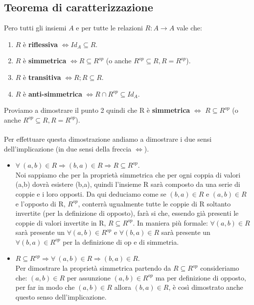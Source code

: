 \subsection{Teorema di caratterizzazione}
\begin{theorem}\label{Teorema-caratterizzazione}
    Pero tutti gli insiemi $A$ e per tutte le relazioni $R: A \rightarrow A$ vale che:
    \begin{enumerate}
        \item $R$ è \textbf{riflessiva} $\Longleftrightarrow Id_A \subseteq R$.
        \item $R$ è \textbf{simmetrica} $\Longleftrightarrow R \subseteq R^{op}$ (o anche $R^{op} \subseteq R, R = R^{op}$).
        \item $R$ è \textbf{transitiva} $\Longleftrightarrow R;R \subseteq R$.
        \item $R$ è \textbf{anti-simmetrica} $\Longleftrightarrow R \cap R^{op} \subseteq Id_A$.
    \end{enumerate}
\end{theorem}
\begin{demostration}[Simmetrica]
Proviamo a dimostrare il punto 2 quindi che R è \textbf{simmetrica} $\Longleftrightarrow$ $R \subseteq R^{op}$ (o anche $R^{op} \subseteq R, R = R^{op}$).\\\\
Per effettuare questa dimostrazione andiamo a dimostrare i due sensi dell'implicazione (in due sensi della freccia $\Longleftrightarrow$).
\begin{itemize}
    \item $\forall \: (a,b) \in R \Longrightarrow (b,a) \in R \Longrightarrow R \subseteq R^{op}$.\\
    Noi sappiamo che per la proprietà simmetrica che per ogni coppia di valori (a,b) dovrà esistere (b,a), quindi l'insieme R sarà composto da una serie di coppie e i loro opposti. Da qui deduciamo come se $(b,a) \in R$ e $(a,b) \in R$ e l'opposto di R, $R^{op}$, conterrà ugualmente tutte le coppie di R soltanto invertite (per la definizione di opposto), farà si che, essendo già presenti le coppie di valori invertite in R, $R \subseteq R^{op}$. In maniera più formale:
    $\forall (a,b) \in R$ sarà presente un $\forall (a,b) \in R^{op}$ e $\forall (b,a) \in R$ sarà presente un $\forall (b,a) \in R^{op}$ per la definizione di op e di simmetria.
    \item $R \subseteq R^{op} \Longrightarrow \forall \: (a,b) \in R \Longrightarrow (b,a) \in R $.\\
    Per dimostrare la proprietà simmetrica partendo da $R \subseteq R^{op}$ consideriamo che: $(a,b) \in R$ per assunzione $(a,b) \in R^{op}$ ma per definizione di opposto, per far in modo che $(a,b) \in R$ allora $(b,a) \in R$, è così dimostrato anche questo senso dell'implicazione.
 \end{itemize}
\end{demostration}

